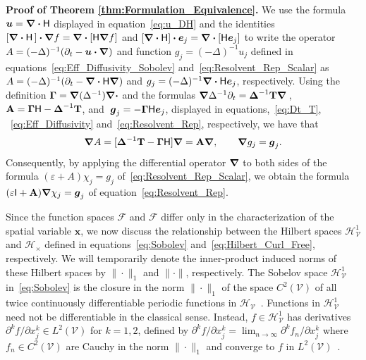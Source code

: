 \documentclass[leqno,onefignum,onetabnum]{siamltex1213}
\newcommand{\Tb}{\mathbf{T}}
\newcommand{\Ab}{\mathbf{A}}
\newcommand{\Vc}{\mathcal{V}}
\newcommand{\Hc}{\mathcal{H}}
\newcommand{\Fc}{\mathcal{F}}
\newcommand{\Hm}{\mathsf{H}}
\newcommand{\Ib}{\mathsf{I}}
\newcommand{\Hs}{\mathscr{H}}
\newcommand{\Fs}{\mathscr{F}}
\newcommand\bDelta{\mbox{\boldmath${\Delta}$}}
\newcommand\bGamma{\mbox{\boldmath${\Gamma}$}}
\newcommand\bnabla{\mbox{\boldmath${\nabla}$}}
\providecommand\bcdot{\boldsymbol{\cdot}}
\newcommand{\vecg}{\boldsymbol{g}}
\newcommand{\vecx}{\boldsymbol{x}}
\newcommand{\vecu}{\boldsymbol{u}}
\newcommand{\vece}{\boldsymbol{e}}
\begin{document}
\textbf{Proof of Theorem \ref{thm:Formulation_Equivalence}.}\hspace{1ex}
%
We use the formula $\vecu =\bnabla \bcdot\Hm$ displayed in
equation~\eqref{eq:u_DH} and the identities
$[\bnabla\bcdot\Hm\,]\bcdot\bnabla f=\bnabla\bcdot[\Hm\bnabla f]$
and $[\bnabla\bcdot\Hm]\bcdot\vece_j=\bnabla\bcdot[\Hm\vece_j]$ to 
write the operator $A=(-\Delta)^{-1}(\partial_t-\vecu\bcdot\bnabla)$ and function
$g_j=(-\Delta)^{-1}u_j$ defined in 
equations~\eqref{eq:Eff_Diffusivity_Sobolev}
and~\eqref{eq:Resolvent_Rep_Scalar} 
as $A=(-\Delta)^{-1}(\partial_t-\bnabla \bcdot\Hm\bnabla)$ and
$g_j=(-\Delta)^{-1}\bnabla \bcdot\Hm\vece _j$, respectively. Using the definition
$\bGamma=\bnabla (\Delta^{-1})\bnabla \bcdot$ and the formulas
$\bnabla \Delta^{-1}\partial_t=\bDelta^{-1}\Tb\bnabla \,$,
$\Ab=\bGamma\Hm-\bDelta^{-1}\Tb$, and 
$\;\vecg_j=-\bGamma\Hm\vece _j$, 
displayed in equations,~\eqref{eq:Dt_T}, ~\eqref{eq:Eff_Diffusivity}
and~\eqref{eq:Resolvent_Rep}, respectively, we have that     
%
\begin{align}\label{eq:A_Ab_Relation}
  \bnabla A=[\bDelta^{-1}\Tb-\bGamma\Hm]\bnabla =\Ab\bnabla , \qquad
  \bnabla g_j=\vecg_j.
\end{align}
%
Consequently, by applying the
differential operator $\bnabla $ to both sides of the formula
$(\varepsilon+A)\chi_j=g_j$ of~\eqref{eq:Resolvent_Rep_Scalar}, we obtain the
formula  $(\varepsilon\Ib+\Ab)\bnabla \chi_j=\vecg_j$ of
equation~\eqref{eq:Resolvent_Rep}. 



Since the function spaces $\Fs$ and $\Fc$ differ only in the
characterization of the spatial variable $\vecx$, we now discuss the
relationship between the Hilbert spaces $\Hs^1_{\Vc}$ and $\Hc_\times$
defined in equations~\eqref{eq:Sobolev}
and~\eqref{eq:Hilbert_Curl_Free}, respectively. We will temporarily
denote the inner-product induced norms of these Hilbert spaces by
$\|\cdot\|_1$ and $\|\cdot\|$, respectively. The Sobelov space $\Hs^1_{\Vc}$
in~\eqref{eq:Sobolev} is the closure in the norm $\|\cdot\|_1$ of the space
$C^2(\Vc)$ of all twice continuously differentiable periodic functions
in $\Hs_{\Vc}$~\cite{Bhattacharya:AAP:1999:951}. Functions in
$\Hs^1_{\Vc}$ need not be differentiable in the classical
sense. Instead, $f\in\Hs^1_{\Vc}$ has derivatives $\partial^kf/\partial x_j^k\in
L^2(\Vc)$ for $k=1,2$, defined by
$\partial^kf/\partial x_j^k=\lim_{n\to\infty}\partial^kf_n/\partial x_j^k$ where $f_n\in C^2(\Vc)$ are
Cauchy in the norm $\|\cdot\|_1$ and converge to $f$ in
$L^2(\Vc)$~\cite{McOwen:2003:PDE}. 
\end{document}
